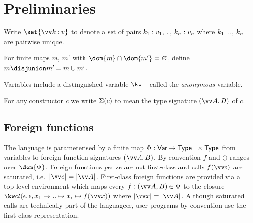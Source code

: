 \section{Preliminaries}
\label{sec:preliminaries}

\begin{definition}
   Write $\set{\seq{\bind{k}{v}}}$ to denote a set of pairs ${{k_1}:{v_1}} ,\, .. ,\, {{k_n}:{v_n}}$
   where ${k_1} ,\, .. ,\, {k_n}$ are pairwise unique.
\end{definition}

\begin{definition}
   For finite maps $m$, $m'$ with $\dom{m} \cap \dom{m'} = \emptyset$, define $m \disjunion m' = m \cup m'$.
\end{definition}



Variables include a distinguished variable $\varAnon$ called the \emph{anonymous}
variable.

For any constructor $c$ we write $\Sigma(c)$ to mean the type signature $\tyForeign{\seq{A}}{D}$ of $c$.

\subsection{Foreign functions}

The language is parameterised by a finite map $\Phi: \textup{\textsf{Var}} \to \textup{\textsf{Type}}^+ \times \textup{\textsf{Type}}$ from variables to foreign
function signatures $(\seq{A}, B)$. By convention $f$ and $\oplus$ ranges over $\dom{\Phi}$. Foreign functions
\emph{per se} are not first-class and calls $\exForeignApp{f}{\seq{e}}$ are saturated, i.e.~$\length{\seq{e}}
= \length{\seq{A}}$. First-class foreign functions are provided via a top-level environment which maps every
$\bind{f}{(\seq{A}, B)} \in \Phi$ to the closure
$\exClosure{\seqEmpty}{\seqEmpty}{\elimVar{x_1}{\elimVar{\iter}{\elimVar{x_i}{\exForeignApp{f}{\seq{x}}}}}}$
where $\length{\seq{x}} = \length{\seq{A}}$. Although saturated calls are technically part of the languageœ, user programs by convention use the first-class representation.
